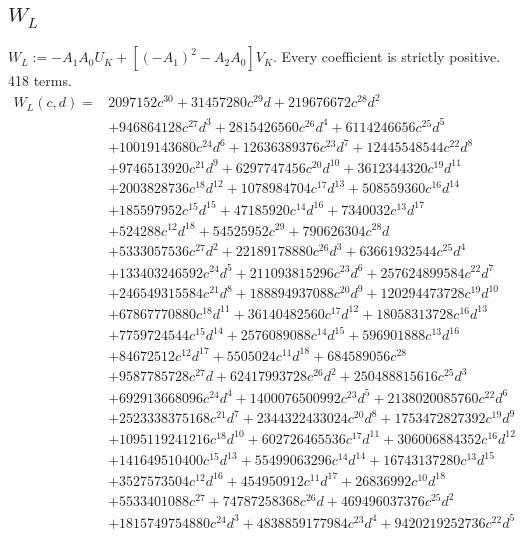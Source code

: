 \subsection*{$W_L$}
$W_L:=-A_1A_0U_K+[(-A_1)^2-A_2A_0]V_K$. Every coefficient is strictly positive. 418 terms.
{\small
\begin{align*}
W_L(c,d)={}&2097152c^{30}+31457280c^{29}d+219676672c^{28}d^{2}\\
&+946864128c^{27}d^{3}+2815426560c^{26}d^{4}+6114246656c^{25}d^{5}\\
&+10019143680c^{24}d^{6}+12636389376c^{23}d^{7}+12445548544c^{22}d^{8}\\
&+9746513920c^{21}d^{9}+6297747456c^{20}d^{10}+3612344320c^{19}d^{11}\\
&+2003828736c^{18}d^{12}+1078984704c^{17}d^{13}+508559360c^{16}d^{14}\\
&+185597952c^{15}d^{15}+47185920c^{14}d^{16}+7340032c^{13}d^{17}\\
&+524288c^{12}d^{18}+54525952c^{29}+790626304c^{28}d\\
&+5333057536c^{27}d^{2}+22189178880c^{26}d^{3}+63661932544c^{25}d^{4}\\
&+133403246592c^{24}d^{5}+211093815296c^{23}d^{6}+257624899584c^{22}d^{7}\\
&+246549315584c^{21}d^{8}+188894937088c^{20}d^{9}+120294473728c^{19}d^{10}\\
&+67867770880c^{18}d^{11}+36140482560c^{17}d^{12}+18058313728c^{16}d^{13}\\
&+7759724544c^{15}d^{14}+2576089088c^{14}d^{15}+596901888c^{13}d^{16}\\
&+84672512c^{12}d^{17}+5505024c^{11}d^{18}+684589056c^{28}\\
&+9587785728c^{27}d+62417993728c^{26}d^{2}+250488815616c^{25}d^{3}\\
&+692913668096c^{24}d^{4}+1400076500992c^{23}d^{5}+2138020085760c^{22}d^{6}\\
&+2523338375168c^{21}d^{7}+2344322433024c^{20}d^{8}+1753472827392c^{19}d^{9}\\
&+1095119241216c^{18}d^{10}+602726465536c^{17}d^{11}+306006884352c^{16}d^{12}\\
&+141649510400c^{15}d^{13}+55499063296c^{14}d^{14}+16743137280c^{13}d^{15}\\
&+3527573504c^{12}d^{16}+454950912c^{11}d^{17}+26836992c^{10}d^{18}\\
&+5533401088c^{27}+74787258368c^{26}d+469496037376c^{25}d^{2}\\
&+1815749754880c^{24}d^{3}+4838859177984c^{23}d^{4}+9420219252736c^{22}d^{5}\\

\end{align*}}
